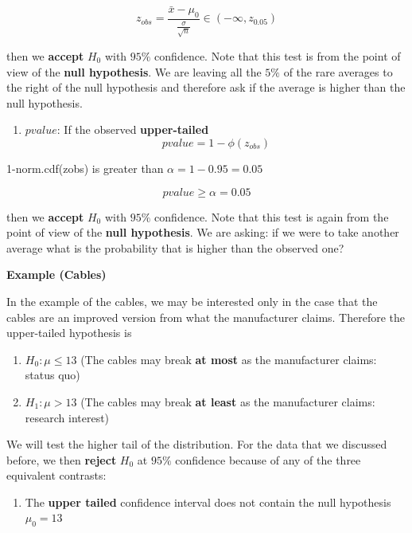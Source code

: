 \documentclass[
]{book}
\providecommand{\tightlist}{%
  \setlength{\itemsep}{0pt}\setlength{\parskip}{0pt}}
\begin{document}
\[z_{obs}=\frac{\bar{x}-\mu_0}{\frac{\sigma}{\sqrt{n}}} \in (-\infty, z_{0.05})\]

then we \textbf{accept} \(H_0\) with \(95\%\) confidence. Note that this test is from the point of view of the \textbf{null hypothesis}. We are leaving all the \(5\%\) of the rare averages to the right of the null hypothesis and therefore ask if the average is higher than the null hypothesis.

\begin{enumerate}
\def\labelenumi{\arabic{enumi}.}
\setcounter{enumi}{2}
\tightlist
\item
  \(pvalue\): If the observed \textbf{upper-tailed} \[pvalue= 1-\phi(z_{obs})\]
\end{enumerate}

1-norm.cdf(zobs) is greater than \(\alpha=1-0.95=0.05\)

\[pvalue \geq \alpha =0.05\]

then we \textbf{accept} \(H_0\) with \(95\%\) confidence. Note that this test is again from the point of view of the \textbf{null hypothesis}. We are asking: if we were to take another average what is the probability that is higher than the observed one?

\textbf{Example (Cables)}

In the example of the cables, we may be interested only in the case that the cables are an improved version from what the manufacturer claims. Therefore the upper-tailed hypothesis is

\begin{enumerate}
\def\labelenumi{\alph{enumi}.}
\tightlist
\item
  \(H_0:\mu \leq 13\) (The cables may break \textbf{at most} as the manufacturer claims: status quo)
\item
  \(H_1:\mu > 13\) (The cables may break \textbf{at least} as the manufacturer claims: research interest)
\end{enumerate}

We will test the higher tail of the distribution.
For the data that we discussed before, we then \textbf{reject} \(H_0\) at \(95\%\) confidence because of any of the three equivalent contrasts:

\begin{enumerate}
\def\labelenumi{\arabic{enumi}.}
\tightlist
\item
  The \textbf{upper tailed} confidence interval does not contain the null hypothesis \(\mu_0=13\)
\end{enumerate}
\end{document}
